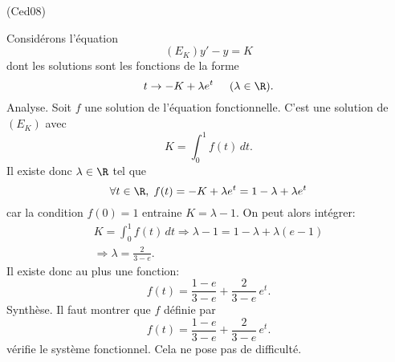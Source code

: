\begin{tiny}(Ced08)\end{tiny} Considérons l'équation 
\[
  (E_K) y' - y = K
\]
dont les solutions sont les fonctions de la forme
\[
  t \rightarrow -K + \lambda e^t  \hspace{0.5cm}(\lambda \in \R).
\]
Analyse. Soit $f$ une solution de l'équation fonctionnelle. C'est une solution de $(E_K)$ avec 
\[
  K = \int_0^1f(t)\,dt.
\]
Il existe donc $\lambda \in \R$ tel que 
\[
  \forall t \in \R, \; f(t) = -K + \lambda e^t = 1 - \lambda + \lambda e^t
\]
car la condition $f(0)=1$ entraine $K= \lambda - 1$. On peut alors intégrer:
\begin{multline*}
  K = \int_0^1f(t)\,dt 
  \Rightarrow 
  \lambda - 1 = 1- \lambda + \lambda(e-1)\\
  \Rightarrow 
  \lambda = \frac{2}{3-e}.
\end{multline*}
Il existe donc au plus une fonction:
\[
  f(t) = \frac{1-e}{3-e}+ \frac{2}{3-e}\,e^t.
\]
Synthèse. Il faut montrer que $f$ définie par
\[
  f(t) = \frac{1-e}{3-e}+ \frac{2}{3-e}\,e^t.
\]
vérifie le système fonctionnel. Cela ne pose pas de difficulté.
